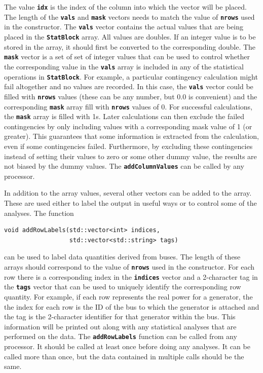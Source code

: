 The value \texttt{\textbf{idx}} is the index of the column into which the vector will be placed. The length of the \texttt{\textbf{vals}} and \texttt{\textbf{mask}} vectors needs to match the value of \texttt{\textbf{nrows}} used in the constructor. The \texttt{\textbf{vals}} vector contains the actual values that are being placed in the \texttt{\textbf{StatBlock}} array. All values are doubles. If an integer value is to be stored in the array, it should first be converted to the corresponding double. The \texttt{\textbf{mask}} vector is a set of set of integer values that can be used to control whether the corresponding value in the \texttt{\textbf{vals}} array is included in any of the statistical operations in \texttt{\textbf{StatBlock}}. For example, a particular contingency calculation might fail altogether and no values are recorded. In this case, the \texttt{\textbf{vals}} vector could be filled with \texttt{\textbf{nrows}} values (these can be any number, but 0.0 is convenient) and the corresponding \texttt{\textbf{mask}} array fill with \texttt{\textbf{nrows}} values of 0. For successful calculations, the \texttt{\textbf{mask}} array is filled with 1s. Later calculations can then exclude the failed contingencies by only including values with a corresponding mask value of 1 (or greater). This guarantees that some information is extracted from the calculation, even if some contingencies failed. Furthermore, by excluding these contingencies instead of setting their values to zero or some other dummy value, the results are not biased by the dummy values. The \texttt{\textbf{addColumnValues}} can be called by any processor.

In addition to the array values, several other vectors can be added to the array. These are used either to label the output in useful ways or to control some of the analyses. The function

{
\color{red}
\begin{Verbatim}[fontseries=b]
void addRowLabels(std::vector<int> indices,
                  std::vector<std::string> tags)
\end{Verbatim}
}

can be used to label data quantities derived from buses. The length of these arrays should correspond to the value of \texttt{\textbf{nrows}} used in the constructor. For each row there is a corresponding index in the \texttt{\textbf{indices}} vector and a 2-character tag in the \texttt{\textbf{tags}} vector that can be used to uniquely identify the corresponding row quantity. For example, if each row represents the real power for a generator, the the index for each row is the ID of the bus to which the generator is attached and the tag is the 2-character identifier for that generator within the bus. This information will be printed out along with any statistical analyses that are performed on the data. The \texttt{\textbf{addRowLabels}} function can be called from any processor. It should be called at least once before doing any analyses. It can be called more than once, but the data contained in multiple calls should be the same.

